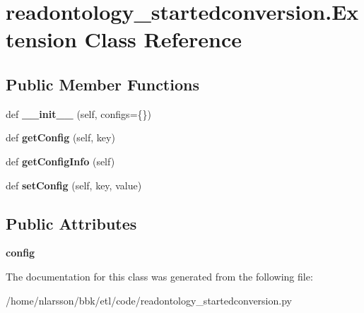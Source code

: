 \hypertarget{classreadontology__startedconversion_1_1Extension}{}\section{readontology\+\_\+startedconversion.\+Extension Class Reference}
\label{classreadontology__startedconversion_1_1Extension}
\subsection*{Public Member Functions}
\begin{DoxyCompactItemize}
\item 
\mbox{\label{classreadontology__startedconversion_1_1Extension_a12f45f18fa8bb07bf518bc75dadc6a4b}} 
def {\bfseries \+\_\+\+\_\+init\+\_\+\+\_\+} (self, configs=\{\})
\item 
\mbox{\label{classreadontology__startedconversion_1_1Extension_aa4985f2cf17ac8125886507482918d71}} 
def {\bfseries get\+Config} (self, key)
\item 
\mbox{\label{classreadontology__startedconversion_1_1Extension_a6b63cf0b7b46ccb35db6e0594b989632}} 
def {\bfseries get\+Config\+Info} (self)
\item 
\mbox{\label{classreadontology__startedconversion_1_1Extension_a717d73dc076c50c97d0e2de99f7fc622}} 
def {\bfseries set\+Config} (self, key, value)
\end{DoxyCompactItemize}
\subsection*{Public Attributes}
\begin{DoxyCompactItemize}
\item 
\mbox{\label{classreadontology__startedconversion_1_1Extension_ae2c26dbcc79e673202a229dbc35ae26e}} 
{\bfseries config}
\end{DoxyCompactItemize}


The documentation for this class was generated from the following file\+:\begin{DoxyCompactItemize}
\item 
/home/nlarsson/bbk/etl/code/readontology\+\_\+startedconversion.\+py\end{DoxyCompactItemize}
